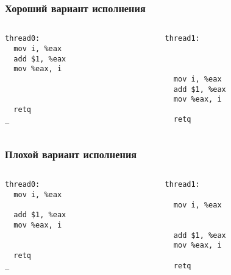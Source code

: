 \begin{frame}[fragile]
\frametitle{Хороший вариант исполнения}
\begin{columns}
  \begin{column}{.45\linewidth}
    \begin{lstlisting}[basicstyle=\small]
thread0:
  mov i, %eax
  add $1, %eax
  mov %eax, i



  retq
_
    \end{lstlisting}
  \end{column}
  \begin{column}{.45\linewidth}
    \begin{lstlisting}[basicstyle=\small]
thread1:



  mov i, %eax
  add $1, %eax
  mov %eax, i

  retq 
    \end{lstlisting}
  \end{column}
\end{columns}
\end{frame}

\begin{frame}[fragile]
\frametitle{Плохой вариант исполнения}
\begin{columns}
  \begin{column}{.45\linewidth}
    \begin{lstlisting}[basicstyle=\small]
thread0:
  mov i, %eax

  add $1, %eax
  mov %eax, i


  retq
_
    \end{lstlisting}
  \end{column}
  \begin{column}{.45\linewidth}
    \begin{lstlisting}[basicstyle=\small]
thread1:

  mov i, %eax


  add $1, %eax
  mov %eax, i

  retq 
    \end{lstlisting}
  \end{column}
\end{columns}
\end{frame}

